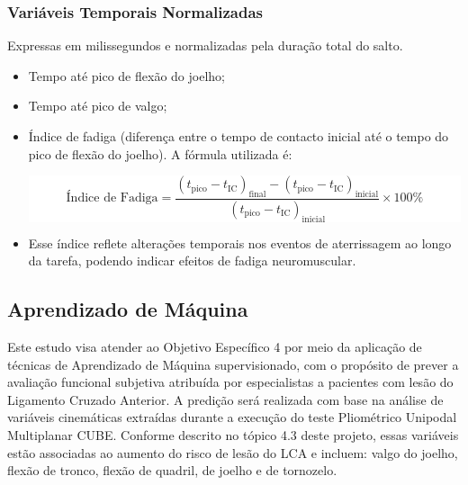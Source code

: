 \documentclass{article}
\begin{document}
\subsubsection{Variáveis Temporais Normalizadas}
Expressas em milissegundos e normalizadas pela duração total do salto.%

\begin{itemize}
    \item Tempo até pico de flexão do joelho;
    \item Tempo até pico de valgo;
    \item
        Índice de fadiga (diferença entre o tempo de contacto inicial até o tempo do pico de flexão do joelho). A fórmula utilizada é:
        
    \colorbox{white}{%
        \parbox{\dimexpr\linewidth-2\fboxsep}{%
        \[
        \text{Índice de Fadiga} = \frac{(t_{\text{pico}} - t_{\text{IC}})_{\text{final}} - (t_{\text{pico}} - t_{\text{IC}})_{\text{inicial}}}{(t_{\text{pico}} - t_{\text{IC}})_{\text{inicial}}} \times 100\%
        \]
}}
    \item Esse índice reflete alterações temporais nos eventos de aterrissagem ao longo da tarefa, podendo indicar efeitos de fadiga neuromuscular.
\end{itemize}




















\subsection{Aprendizado de Máquina}
\noindent Este estudo visa atender ao Objetivo Específico 4 por meio da aplicação de técnicas de Aprendizado de Máquina supervisionado, com o propósito de prever a avaliação funcional subjetiva atribuída por especialistas a pacientes com lesão do Ligamento Cruzado Anterior. A predição será realizada com base na análise de variáveis cinemáticas extraídas durante a execução do teste Pliométrico Unipodal Multiplanar CUBE. Conforme descrito no tópico 4.3 deste projeto, essas variáveis estão associadas ao aumento do risco de lesão do LCA e incluem: valgo do joelho, flexão de tronco, flexão de quadril, de joelho e de tornozelo.
\end{document}
